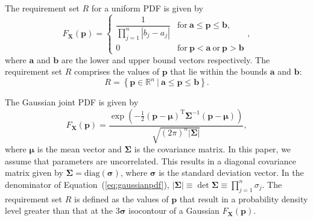 The requirement set $R$ for a uniform \ac{PDF} is given by
%
\begin{equation} \label{eq:uniformpdf}
	F_\mathbf{X}(\mathbf{p})={\begin{cases}{\dfrac {1}{\prod\limits_{j=1}^{n} \left|b_j - a_j\right|}}&\mathrm {for} \ \mathbf{a}\leq \mathbf{p}\leq \mathbf{b},\\[8pt]0&\mathrm {for} \ \mathbf{p}<\mathbf{a}\ \mathrm {or} \ \mathbf{p}>\mathbf{b}\end{cases}},
\end{equation}
%
where $\mathbf{a}$ and $\mathbf{b}$ are the lower and upper bound vectors respectively. The requirement set $R$ comprises the values of $\mathbf{p}$ that lie within the bounds $\mathbf{a}$ and $\mathbf{b}$:
%
\begin{equation} \label{eq:requirementsetuniform}
	\textit{R} = \left\{\mathbf{p} \in \mathbb{R}^n~|~\mathbf{a}\leq \mathbf{p}\leq \mathbf{b}\right\}.
\end{equation}

The Gaussian joint \ac{PDF} is given by
%
\begin{equation} \label{eq:gaussianpdf}
	F_\mathbf{X}(\mathbf{p})={\frac {\exp \left(-{\frac {1}{2}}({\mathbf {p} }-{\boldsymbol {\mu }})^{\mathrm {T} }{\boldsymbol {\Sigma }}^{-1}({\mathbf {p} }-{\boldsymbol {\mu }})\right)}{\sqrt {(2\pi )^{n}|{\boldsymbol {\Sigma }}|}}},
\end{equation}
%
where $\boldsymbol{\mu}$ is the mean vector and $\boldsymbol{\Sigma}$ is the covariance matrix. In this paper, we assume that parameters are uncorrelated. This results in a diagonal covariance matrix given by $\boldsymbol{\Sigma} = \mathrm{diag}\left(\boldsymbol{\sigma}\right)$, where $\boldsymbol{\sigma}$ is the standard deviation vector. In the denominator of Equation~(\ref{eq:gaussianpdf}), $|{\boldsymbol {\Sigma }}|\equiv \det {\boldsymbol {\Sigma }} \equiv \prod\limits_{j=1}^{n} \sigma_j$. The requirement set $R$ is defined as the values of $\mathbf{p}$ that result in a probability density level greater than that at the $3 \boldsymbol{\sigma}$ isocontour of a Gaussian $F_\mathbf{X}(\mathbf{p})$.

